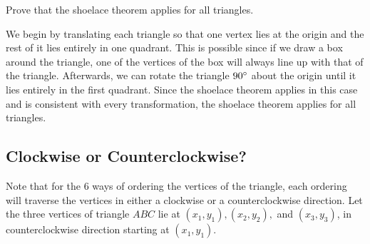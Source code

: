 \documentclass[11pt]{article}
\begin{document}
\begin{problem}  Prove that the shoelace theorem applies for all triangles. \end{problem}

\begin{solution}
We begin by translating each triangle so that one vertex lies at the origin and the rest of it lies entirely in one quadrant. This is possible since if we draw a box around the triangle, one of the vertices of the box will always line up with that of the triangle. Afterwards, we can rotate the triangle $90 \degree$ about the origin until it lies entirely in the first quadrant. Since the shoelace theorem applies in this case and is consistent with every transformation, the shoelace theorem applies for all triangles.
\end{solution}

\subsection{Clockwise or Counterclockwise?}
Note that for the 6 ways of ordering the vertices of the triangle, each ordering will traverse the vertices in either a clockwise or a counterclockwise direction. 
\newline \noindent Let the three vertices of triangle $ABC$ lie at $(x_1, y_1), (x_2, y_2),$  and $(x_3, y_3)$, in counterclockwise direction starting at $(x_1, y_1)$. 
\end{document}
